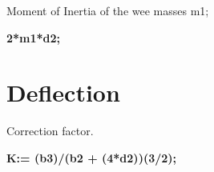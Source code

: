 \documentclass{article}
\begin{document}
\begin{maplegroup}
\begin{Maple Normal}{
Moment of Inertia of the wee masses m1;}\end{Maple Normal}

\textbf{2*m1*d2;}\mapleresult
\begin{maplelatex}
\end{maplelatex}
\end{maplegroup}
\begin{maplegroup}
\begin{mapleinput}
\end{mapleinput}
\end{maplegroup}
\section{\textbf{Deflection}}
\begin{maplegroup}
\begin{Maple Normal}{
}\end{Maple Normal}
\end{maplegroup}
\begin{maplegroup}
\begin{mapleinput}
\end{mapleinput}
\mapleresult
\begin{maplelatex}
\end{maplelatex}
\end{maplegroup}
\begin{maplegroup}
\begin{mapleinput}
\end{mapleinput}
\mapleresult
\begin{maplelatex}
\end{maplelatex}
\end{maplegroup}
\begin{maplegroup}
\begin{Maple Normal}{
Correction factor.}\end{Maple Normal}

\textbf{K:= (b3)/(b2 + (4*d2))(3/2);}\mapleresult
\begin{maplelatex}
\end{maplelatex}
\end{maplegroup}
\end{document}
